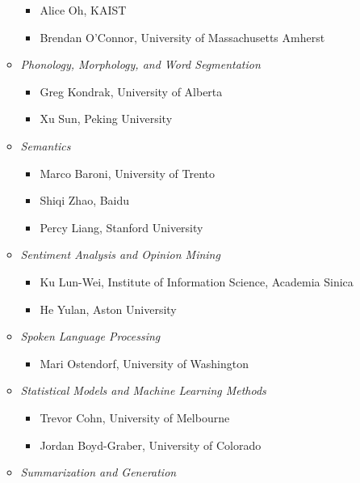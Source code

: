 \begin{itemize}[itemsep=7pt, leftmargin=0cm, label={}]
\begin{itemize}[leftmargin=0.5cm, itemsep=6pt, label={}]
\begin{itemize}[nosep, leftmargin=0.5cm, label={}]
\item Alice Oh, KAIST
\item Brendan O'Connor, University of Massachusetts Amherst
\end{itemize}
\item \emph{Phonology, Morphology, and Word Segmentation}

\begin{itemize}[nosep, leftmargin=0.5cm, label={}]
\item Greg Kondrak, University of Alberta
\item Xu Sun, Peking University
\end{itemize}
\item \emph{Semantics}

\begin{itemize}[nosep, leftmargin=0.5cm, label={}]
\item Marco Baroni, University of Trento
\item Shiqi Zhao, Baidu
\item Percy Liang, Stanford University
\end{itemize}
\item \emph{Sentiment Analysis and Opinion Mining}

\begin{itemize}[nosep, leftmargin=0.5cm, label={}]
\item Ku Lun-Wei, Institute of Information Science, Academia Sinica
\item He Yulan, Aston University
\end{itemize}
\item \emph{Spoken Language Processing}

\begin{itemize}[nosep, leftmargin=0.5cm, label={}]
\item Mari Ostendorf, University of Washington
\end{itemize}
\item \emph{Statistical Models and Machine Learning Methods}

\begin{itemize}[nosep, leftmargin=0.5cm, label={}]
\item Trevor Cohn, University of Melbourne
\item Jordan Boyd-Graber, University of Colorado
\end{itemize}
\item \emph{Summarization and Generation}


\end{itemize}
\end{itemize}
